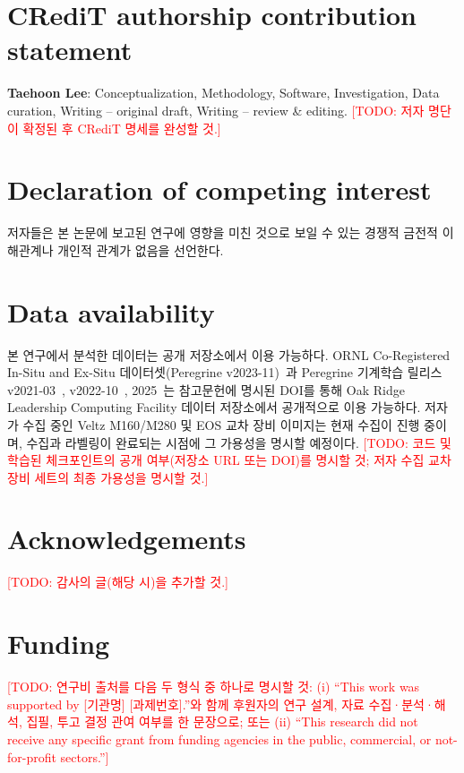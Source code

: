 \documentclass[preprint,12pt]{elsarticle}
\newcommand{\TODO}[1]{\textcolor{red}{[TODO: #1]}}
\begin{document}

\section*{CRediT authorship contribution statement}
\textbf{Taehoon Lee}: Conceptualization, Methodology, Software,
Investigation, Data curation, Writing -- original draft, Writing -- review
\& editing. \TODO{저자 명단이 확정된 후 CRediT 명세를 완성할 것.}

\section*{Declaration of competing interest}
저자들은 본 논문에 보고된 연구에 영향을 미친 것으로 보일 수 있는
경쟁적 금전적 이해관계나 개인적 관계가 없음을 선언한다.

\section*{Data availability}
본 연구에서 분석한 데이터는 공개 저장소에서 이용 가능하다. ORNL
Co-Registered In-Situ and Ex-Situ 데이터셋(Peregrine
v2023-11)~\cite{ORNL_CoRegistered_Dataset}과 Peregrine 기계학습 릴리스
v2021-03~\cite{Peregrine_v2021_03}, v2022-10~\cite{Peregrine_v2022_10},
2025~\cite{Peregrine_v2025_TODO}는 참고문헌에 명시된 DOI를 통해 Oak Ridge
Leadership Computing Facility 데이터 저장소에서 공개적으로 이용 가능하다.
저자가 수집 중인 Veltz M160/M280 및 EOS 교차 장비 이미지는 현재 수집이
진행 중이며, 수집과 라벨링이 완료되는 시점에 그 가용성을 명시할
예정이다. \TODO{코드 및 학습된 체크포인트의 공개 여부(저장소 URL 또는
DOI)를 명시할 것; 저자 수집 교차 장비 세트의 최종 가용성을 명시할 것.}

\section*{Acknowledgements}
\TODO{감사의 글(해당 시)을 추가할 것.}

\section*{Funding}
\TODO{연구비 출처를 다음 두 형식 중 하나로 명시할 것: (i) ``This work
was supported by [기관명] [과제번호].''와 함께 후원자의 연구 설계, 자료
수집·분석·해석, 집필, 투고 결정 관여 여부를 한 문장으로; 또는 (ii)
``This research did not receive any specific grant from funding agencies in
the public, commercial, or not-for-profit sectors.''}
\end{document}
